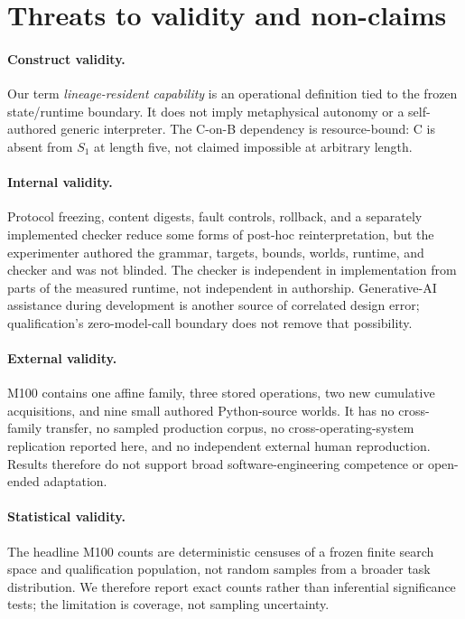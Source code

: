 \documentclass[10pt]{article}
\begin{document}
\section{Threats to validity and non-claims}
\label{sec:threats}
\paragraph{Construct validity.} Our term \emph{lineage-resident capability} is an operational definition tied to the frozen state/runtime boundary. It does not imply metaphysical autonomy or a self-authored generic interpreter. The C-on-B dependency is resource-bound: C is absent from $S_1$ at length five, not claimed impossible at arbitrary length.

\paragraph{Internal validity.} Protocol freezing, content digests, fault controls, rollback, and a separately implemented checker reduce some forms of post-hoc reinterpretation, but the experimenter authored the grammar, targets, bounds, worlds, runtime, and checker and was not blinded. The checker is independent in implementation from parts of the measured runtime, not independent in authorship. Generative-AI assistance during development is another source of correlated design error; qualification's zero-model-call boundary does not remove that possibility.

\paragraph{External validity.} M100 contains one affine family, three stored operations, two new cumulative acquisitions, and nine small authored Python-source worlds. It has no cross-family transfer, no sampled production corpus, no cross-operating-system replication reported here, and no independent external human reproduction. Results therefore do not support broad software-engineering competence or open-ended adaptation.

\paragraph{Statistical validity.} The headline M100 counts are deterministic censuses of a frozen finite search space and qualification population, not random samples from a broader task distribution. We therefore report exact counts rather than inferential significance tests; the limitation is coverage, not sampling uncertainty.
\end{document}
